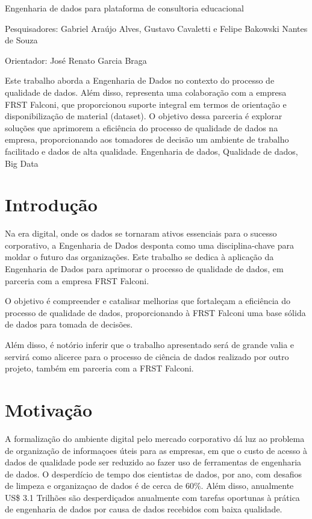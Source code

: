 \relatorio
{Engenharia de dados para plataforma de consultoria educacional}
{
    \noindent Pesquisadores: Gabriel Araújo Alves, Gustavo Cavaletti e Felipe Bakowski Nantes de Souza
    
    \noindent Orientador: José Renato Garcia Braga
}
{
    Este trabalho aborda a Engenharia de Dados no contexto do processo de qualidade de dados. Além disso, representa uma colaboração com a empresa FRST Falconi, que proporcionou suporte integral em termos de orientação e disponibilização de material (dataset). O objetivo dessa parceria é explorar soluções que aprimorem a eficiência do processo de qualidade de dados na empresa, proporcionando aos tomadores de decisão um ambiente de trabalho facilitado e dados de alta qualidade.
}
{Engenharia de dados, Qualidade de dados, Big Data}

\section{Introdução}

Na era digital, onde os dados se tornaram ativos essenciais para o sucesso corporativo, a Engenharia de Dados desponta como uma disciplina-chave para moldar o futuro das organizações. Este trabalho se dedica à aplicação da Engenharia de Dados para aprimorar o processo de qualidade de dados, em parceria com a empresa FRST Falconi.

O objetivo é compreender e catalisar melhorias que fortaleçam a eficiência do processo de qualidade de dados, proporcionando à FRST Falconi uma base sólida de dados para tomada de decisões.

Além disso, é notório inferir que o trabalho apresentado será de grande valia e servirá como alicerce para o processo de ciência de dados realizado por outro projeto, também em parceria com a FRST Falconi.

\section{Motivação}

A formalização do ambiente digital pelo mercado corporativo dá luz ao problema de organização de informaçoes úteis para as empresas, em que o custo de acesso à dados de qualidade pode ser reduzido ao fazer uso de ferramentas de engenharia de dados. O desperdício de tempo dos cientistas de dados, por ano, com desafios de limpeza e organizaçao de dados é de cerca  de 60\%. Além disso, anualmente US\$ 3.1 Trilhões são desperdiçados anualmente com tarefas oportunas à prática de engenharia de dados por causa de dados recebidos com baixa qualidade.



